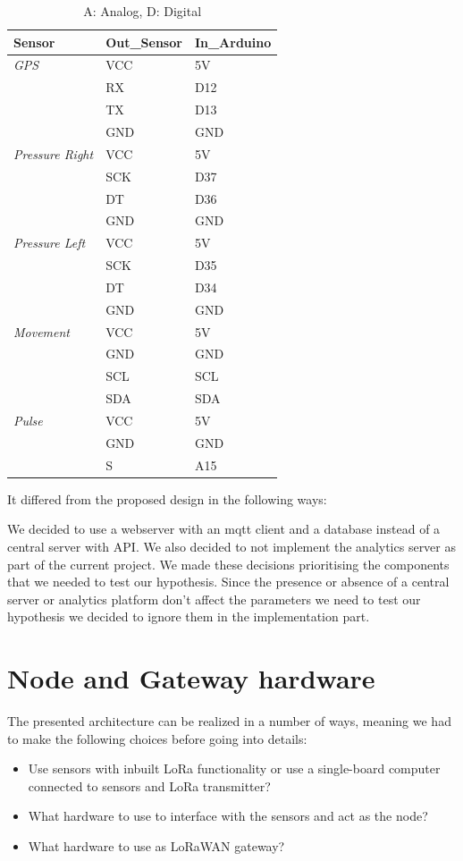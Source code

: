 \begin{table}[h]
	\begin{tabular}{l|ll}
		\textbf{Sensor} & \textbf{Out\_Sensor} & \textbf{In\_Arduino} \\\hline
		\textit{GPS} & VCC & 5V \\
		& RX & D12 \\
		& TX & D13 \\
		& GND & GND \\\hline
		\textit{Pressure Right} & VCC & 5V \\
		& SCK & D37 \\
		& DT & D36 \\
		& GND & GND \\\hline
		\textit{Pressure Left} & VCC & 5V \\
		& SCK & D35 \\
		& DT & D34 \\
		& GND & GND \\\hline
		\textit{Movement} & VCC & 5V \\
		& GND & GND \\
		& SCL & SCL \\
		& SDA & SDA \\\hline
		\textit{Pulse} & VCC & 5V \\
		& GND & GND \\
		& S & A15 
	\end{tabular}
	\caption[Blueprint connections node]{A: Analog, D: Digital}
\end{table}

It differed from the proposed design in the following ways:

We decided to use a webserver with an mqtt client and a database instead of a central server with API. We also decided to not implement the analytics server as part of the current project. We made these decisions prioritising the components that we needed to test our hypothesis. Since the presence or absence of a central server or analytics platform don't affect the parameters we need to test our hypothesis we decided to ignore them in the implementation part.


\section{Node and Gateway hardware}
	The presented architecture can be realized in a number of ways, meaning we had to make the following choices before going into details:

	\begin{itemize}
		\item Use sensors with inbuilt LoRa functionality or use a single-board computer connected to sensors and LoRa transmitter?
		\item What hardware to use to interface with the sensors and act as the node?
		\item What hardware to use as LoRaWAN gateway?
	\end{itemize}


